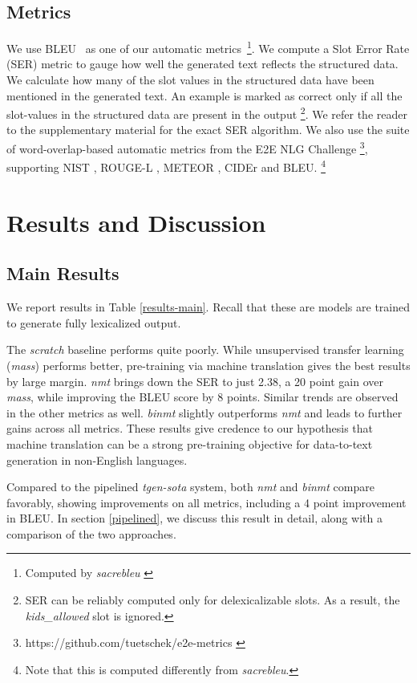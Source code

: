 \documentclass[11pt,a4paper]{article}
\begin{document}
\subsection{Metrics}
We use BLEU~\citep{papineni2002bleu} as one of our automatic metrics~\footnote{Computed by \textsl{sacrebleu} \citep{post2018call}}. We compute a Slot Error Rate (SER) metric to gauge how well the generated text reflects the structured data. We calculate how many of the slot values in the structured data have been mentioned in the generated text. An example is marked as correct only if all the slot-values in the structured data are present in the output \footnote{SER can be reliably computed only for delexicalizable slots. As a result, the \textsl{kids\_allowed} slot is ignored.}. We refer the reader to the supplementary  material for the exact SER algorithm. We also use the suite of word-overlap-based automatic metrics from the E2E NLG Challenge \footnote{https://github.com/tuetschek/e2e-metrics \label{e2e-metrics}}, supporting NIST \citep{doddington2002automatic}, ROUGE-L \citep{lin2004rouge}, METEOR \citep{lavie2007meteor}, CIDEr \citep{vedantam2015cider} and BLEU. \footnote{Note that this is computed differently from \textsl{sacrebleu}.}


\section{Results and Discussion} 

\subsection{Main Results} \label{results-and-discussion}
We report results in Table \ref{results-main}. Recall that these are models are trained to generate fully lexicalized output. \par
The \textsl{scratch} baseline performs quite poorly. While unsupervised transfer learning (\textsl{mass}) performs better, pre-training via machine translation gives the best results by large margin. \textsl{nmt} brings down the SER to just 2.38, a 20 point gain over \textsl{mass}, while improving the BLEU score by 8 points. Similar trends are observed in the other metrics as well. \textsl{binmt} slightly outperforms \textsl{nmt} and leads to further gains across all metrics. These results give credence to our hypothesis that machine translation can be a strong pre-training objective for data-to-text generation in non-English languages. \par
Compared to the pipelined \textsl{tgen-sota} system, both \textsl{nmt} and \textsl{binmt} compare favorably, showing improvements on all metrics, including a 4 point improvement in BLEU. In section \ref{pipelined}, we discuss this result in detail, along with a comparison of the two approaches.
\end{document}
